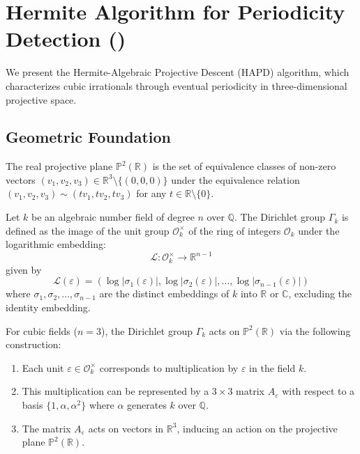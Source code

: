 \section{Hermite Algorithm for Periodicity Detection (\HAPD)}\label{sec:hapd_algorithm}

We present the Hermite-Algebraic Projective Descent (HAPD) algorithm, which characterizes cubic irrationals through eventual periodicity in three-dimensional projective space.

\subsection{Geometric Foundation}

\begin{definition}
The real projective plane $\mathbb{P}^2(\mathbb{R})$ is the set of equivalence classes of non-zero vectors $(v_1, v_2, v_3) \in \mathbb{R}^3 \setminus \{(0,0,0)\}$ under the equivalence relation $(v_1, v_2, v_3) \sim (tv_1, tv_2, tv_3)$ for any $t \in \mathbb{R} \setminus \{0\}$.
\end{definition}

\begin{definition}\label{def:dirichlet_group}
Let $k$ be an algebraic number field of degree $n$ over $\mathbb{Q}$. The Dirichlet group $\Gamma_k$ is defined as the image of the unit group $\mathcal{O}_k^\times$ of the ring of integers $\mathcal{O}_k$ under the logarithmic embedding:
\begin{equation}
\mathcal{L}: \mathcal{O}_k^\times \to \mathbb{R}^{n-1}
\end{equation}
given by
\begin{equation}
\mathcal{L}(\varepsilon) = (\log|\sigma_1(\varepsilon)|, \log|\sigma_2(\varepsilon)|, \ldots, \log|\sigma_{n-1}(\varepsilon)|)
\end{equation}
where $\sigma_1, \sigma_2, \ldots, \sigma_{n-1}$ are the distinct embeddings of $k$ into $\mathbb{R}$ or $\mathbb{C}$, excluding the identity embedding.

For cubic fields ($n=3$), the Dirichlet group $\Gamma_k$ acts on $\mathbb{P}^2(\mathbb{R})$ via the following construction:
\begin{enumerate}
\item Each unit $\varepsilon \in \mathcal{O}_k^\times$ corresponds to multiplication by $\varepsilon$ in the field $k$.
\item This multiplication can be represented by a $3 \times 3$ matrix $A_\varepsilon$ with respect to a basis $\{1, \alpha, \alpha^2\}$ where $\alpha$ generates $k$ over $\mathbb{Q}$.
\item The matrix $A_\varepsilon$ acts on vectors in $\mathbb{R}^3$, inducing an action on the projective plane $\mathbb{P}^2(\mathbb{R})$.
\end{enumerate}
\end{definition}

